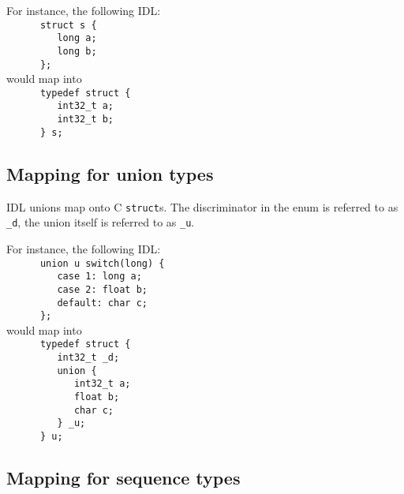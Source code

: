 For instance, the following IDL:\hfill\\
\verb|      struct s {|\hfill\\
\verb|         long a;|\hfill\\
\verb|         long b;|\hfill\\
\verb|      };|\hfill\\

would map into\hfill\\
\verb|      typedef struct {|\hfill\\
\verb|         int32_t a;|\hfill\\
\verb|         int32_t b;|\hfill\\
\verb|      } s;|\hfill\\


\subsection{Mapping for union types}

\GenoM{}  IDL unions map onto  C {\tt  struct}s. The discriminator in the enum
is referred to as {\tt \_d}, the union itself is referred to as {\tt \_u}.

For instance, the following IDL:\hfill\\
\verb|      union u switch(long) {|\hfill\\
\verb|         case 1: long a;|\hfill\\
\verb|         case 2: float b;|\hfill\\
\verb|         default: char c;|\hfill\\
\verb|      };|\hfill\\

would map into\hfill\\
\verb|      typedef struct {|\hfill\\
\verb|         int32_t _d;|\hfill\\
\verb|         union {|\hfill\\
\verb|            int32_t a;|\hfill\\
\verb|            float b;|\hfill\\
\verb|            char c;|\hfill\\
\verb|         } _u;|\hfill\\
\verb|      } u;|\hfill\\


\subsection{Mapping for sequence types}

